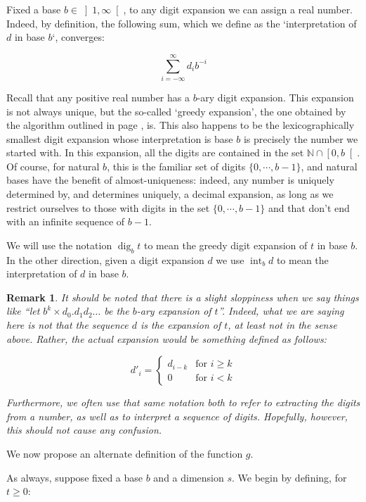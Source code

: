 \documentclass[11pt]{amsart}
\newcommand{\N}{\mathbb{N}}
\newtheorem{remark}{Remark}
\DeclareMathOperator{\dig}{dig}
\DeclareMathOperator{\intr}{int}
\begin{document}
Fixed a base $b \in \left]1, \infty \right[$, to any digit expansion we can assign a real number. Indeed, by definition, the following sum, which we define as the `interpretation of $d$ in base $b$`, converges:

\[ \sum_{i = -\infty}^\infty d_i b^{-i} \]

Recall that any positive real number has a $b$-ary digit expansion. This expansion is not always unique, but the so-called `greedy expansion', the one obtained by the algorithm outlined in page \pageref{digalg}, is. This also happens to be the lexicographically smallest digit expansion whose interpretation is base $b$ is precisely the number we started with. In this expansion, all the digits are contained in the set $\N \cap \left[0, b \right[$. Of course, for natural $b$, this is the familiar set of digits $\{0, \cdots, b-1 \}$, and natural bases have the benefit of almost-uniqueness: indeed, any number is uniquely determined by, and determines uniquely, a decimal expansion, as long as we restrict ourselves to those with digits in the set $\{0, \cdots, b-1 \}$ and that don't end with an infinite sequence of $b-1$.

We will use the notation $\dig_b t$ to mean the greedy digit expansion of $t$ in base $b$. In the other direction, given a digit expansion $d$ we use $\intr_b d$ to mean the interpretation of $d$ in base $b$.

\begin{remark}
It should be noted that there is a slight sloppiness when we say things like ``let $b^k \times d_0 . d_1 d_2 \dots$ be the $b$-ary expansion of $t$''. Indeed, what we are saying here is not that the sequence $d$ is the expansion of $t$, at least not in the sense above. Rather, the actual expansion would be something defined as follows:

\[d'_i =
\begin{cases}
d_{i-k} & \text{for $i \geq k$}\\
0 & \text{for $i < k$}
\end{cases}
\]

Furthermore, we often use that same notation both to refer to extracting the digits from a number, as well as to interpret a sequence of digits. Hopefully, however, this should not cause any confusion.
\end{remark}

We now propose an alternate definition of the function $g$.

As always, suppose fixed a base $b$ and a dimension $s$. We begin by defining, for $t \geq 0$:
\end{document}
